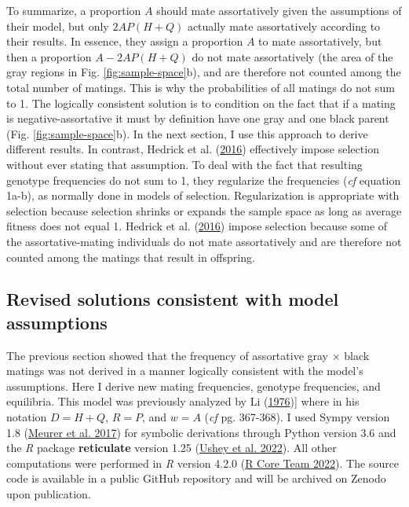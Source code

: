 \documentclass[
]{article}
\begin{document}
To summarize, a proportion \(A\) should mate assortatively given the assumptions of their model, but only \(2 AP(H+Q)\) actually mate assortatively according to their results. In essence, they assign a proportion \(A\) to mate assortatively, but then a proportion \(A - 2 AP(H+Q)\) do not mate assortatively (the area of the gray regions in Fig. \ref{fig:sample-space}b), and are therefore not counted among the total number of matings. This is why the probabilities of all matings do not sum to 1. The logically consistent solution is to condition on the fact that if a mating is negative-assortative it must by definition have one gray and one black parent (Fig. \ref{fig:sample-space}b). In the next section, I use this approach to derive different results. In contrast, Hedrick et al. (\protect\hyperlink{ref-hedrick_negative-assortative_2016}{2016}) effectively impose selection without ever stating that assumption. To deal with the fact that resulting genotype frequencies do not sum to 1, they regularize the frequencies (\emph{cf} equation 1a-b), as normally done in models of selection. Regularization is appropriate with selection because selection shrinks or expands the sample space as long as average fitness does not equal 1. Hedrick et al. (\protect\hyperlink{ref-hedrick_negative-assortative_2016}{2016}) impose selection because some of the assortative-mating individuals do not mate assortatively and are therefore not counted among the matings that result in offspring.

\hypertarget{revised-solutions-consistent-with-model-assumptions}{%
\subsection{Revised solutions consistent with model assumptions}\label{revised-solutions-consistent-with-model-assumptions}}

The previous section showed that the frequency of assortative gray \(\times\) black matings was not derived in a manner logically consistent with the model's assumptions. Here I derive new mating frequencies, genotype frequencies, and equilibria. This model was previously analyzed by Li (\protect\hyperlink{ref-li_first_1976}{1976}){]} where in his notation \(D = H + Q\), \(R = P\), and \(w = A\) (\emph{cf} pg. 367-368). I used Sympy version 1.8 (\protect\hyperlink{ref-meurer_sympy:_2017}{Meurer et al. 2017}) for symbolic derivations through Python version 3.6 and the \emph{R} package \textbf{reticulate} version 1.25 (\protect\hyperlink{ref-ushey_reticulate_2022}{Ushey et al. 2022}). All other computations were performed in \emph{R} version 4.2.0 (\protect\hyperlink{ref-r_core_team_r_2022}{R Core Team 2022}). The source code is available in a public GitHub repository and will be archived on Zenodo upon publication.
\end{document}
